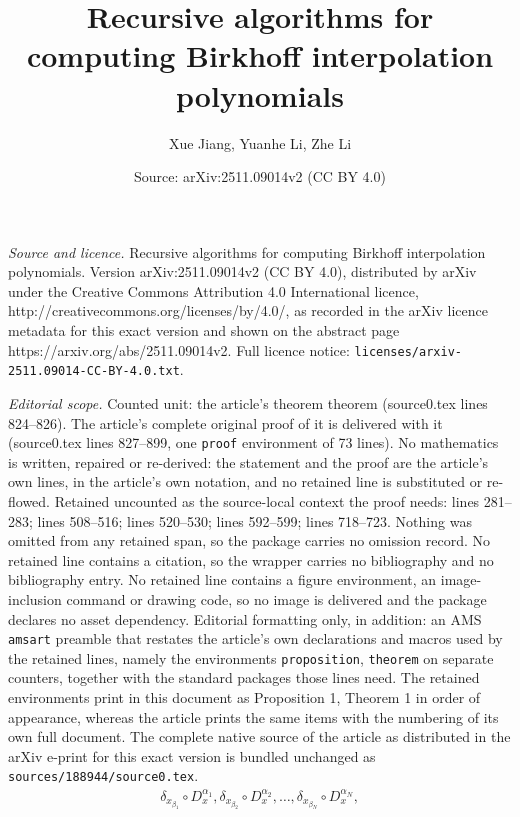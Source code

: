 \documentclass[10pt,a4paper]{amsart}
\title{Recursive algorithms for computing Birkhoff interpolation polynomials}
\author{Xue Jiang, Yuanhe Li, Zhe Li}
\date{Source: arXiv:2511.09014v2 (CC BY 4.0)}
\begin{document}
\maketitle

\noindent\emph{Source and licence.} Recursive algorithms for computing Birkhoff interpolation polynomials. Version arXiv:2511.09014v2 (CC BY 4.0), distributed by arXiv under the Creative Commons Attribution 4.0 International licence, http://creativecommons.org/licenses/by/4.0/, as recorded in the arXiv licence metadata for this exact version and shown on the abstract page https://arxiv.org/abs/2511.09014v2. Full licence notice: \texttt{licenses/arxiv-2511.09014-CC-BY-4.0.txt}.\par\smallskip

\noindent\textit{Editorial scope.} Counted unit: the article's theorem theorem (source0.tex lines 824--826). The article's complete original proof of it is delivered with it (source0.tex lines 827--899, one \texttt{proof} environment of 73 lines). No mathematics is written, repaired or re-derived: the statement and the proof are the article's own lines, in the article's own notation, and no retained line is substituted or re-flowed.  Retained uncounted as the source-local context the proof needs: lines 281--283; lines 508--516; lines 520--530; lines 592--599; lines 718--723.  Nothing was omitted from any retained span, so the package carries no omission record.  No retained line contains a citation, so the wrapper carries no bibliography and no bibliography entry.  No retained line contains a figure environment, an image-inclusion command or drawing code, so no image is delivered and the package declares no asset dependency.  Editorial formatting only, in addition: an AMS \texttt{amsart} preamble that restates the article's own declarations and macros used by the retained lines, namely the environments \texttt{proposition}, \texttt{theorem} on separate counters, together with the standard packages those lines need.  The retained environments print in this document as Proposition 1, Theorem 1 in order of appearance, whereas the article prints the same items with the numbering of its own full document.  The complete native source of the article as distributed in the arXiv e-print for this exact version is bundled unchanged as \texttt{sources/188944/source0.tex}.
\begin{align}\label{equa2.1}
   \delta_{x_{\beta_1}}\circ D_x^{\alpha_1},\delta_{x_{\beta_2}}\circ D_x^{\alpha_2},\dots,\delta_{x_{\beta_N}}\circ D_x^{\alpha_N},
\end{align}
\end{document}
